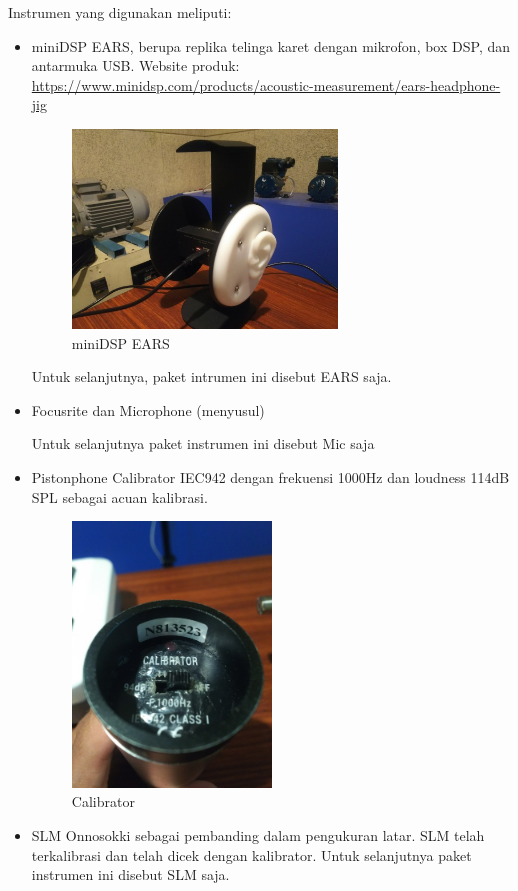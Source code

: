 \documentclass[12pt,]{article}
\begin{document}
	Instrumen yang digunakan meliputi:
	\begin{itemize}
		\item miniDSP EARS, berupa replika telinga karet dengan mikrofon, box DSP, dan antarmuka USB.
		Website produk:\\
		\url{https://www.minidsp.com/products/acoustic-measurement/ears-headphone-jig}
		
		\begin{figure}[!ht]
			\centering
			\includegraphics[width=200pt]{images/ears}
			\caption{miniDSP EARS}
		\end{figure}
	
		Untuk selanjutnya, paket intrumen ini disebut EARS saja.
		
		\item Focusrite dan Microphone (menyusul)
		
		Untuk selanjutnya paket instrumen ini disebut Mic saja
		
		\item Pistonphone Calibrator IEC942 dengan frekuensi 1000Hz dan loudness 114dB SPL sebagai acuan kalibrasi.
		\begin{figure}[!ht]
			\centering
			\includegraphics[width=150pt]{images/calibrator}
			\caption{Calibrator}
		\end{figure}
	
		\item SLM Onnosokki sebagai pembanding dalam pengukuran latar.
		SLM telah terkalibrasi dan telah dicek dengan kalibrator.
		Untuk selanjutnya paket instrumen ini disebut SLM saja.
		

\end{itemize}
\end{document}
